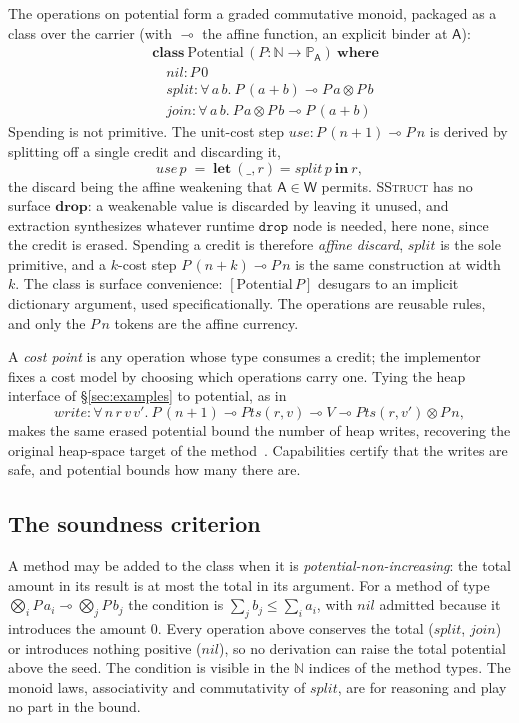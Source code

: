 \documentclass[11pt]{article}
\newcommand{\Wk}{\mathsf{W}}
\newcommand{\Prop}[1]{\mathbb{P}_{#1}}            %
\newcommand{\drp}{\mathtt{drop}}
\theoremstyle{definition}
\theoremstyle{plain}
\begin{document}
The operations on potential form a graded commutative monoid, packaged as a class
over the carrier (with $\multimap$ the affine function, an explicit binder at
$\mathsf{A}$):
\[
\begin{aligned}
&\mathbf{class}\ \mathrm{Potential}\,(P : \mathbb{N}\to\Prop{\mathsf{A}})\ \mathbf{where}\\
&\quad \mathit{nil} : P\,0\\
&\quad \mathit{split} : \forall\,a\,b.\ P\,(a{+}b) \multimap P\,a \otimes P\,b\\
&\quad \mathit{join} : \forall\,a\,b.\ P\,a \otimes P\,b \multimap P\,(a{+}b)
\end{aligned}
\]
Spending is not primitive. The unit-cost step $\mathit{use} : P\,(n{+}1)\multimap
P\,n$ is derived by splitting off a single credit and discarding it,
\[
  \mathit{use}\,p \;=\; \mathbf{let}\ (\_, r) = \mathit{split}\,p\ \mathbf{in}\ r,
\]
the discard being the affine weakening that $\mathsf{A}\in\Wk$ permits.
\textsc{SStruct} has no surface $\mathbf{drop}$: a weakenable value is discarded by
leaving it unused, and extraction synthesizes whatever runtime $\drp$ node is
needed, here none, since the credit is erased. Spending a credit is therefore
\emph{affine discard}, $\mathit{split}$ is the sole primitive, and a $k$-cost step
$P\,(n{+}k)\multimap P\,n$ is the same construction at width $k$. The class is
surface convenience: $[\mathrm{Potential}\,P]$ desugars to an implicit dictionary
argument, used specificationally. The operations are reusable rules, and only the
$P\,n$ tokens are the affine currency.

A \emph{cost point} is any operation whose type consumes a credit; the implementor
fixes a cost model by choosing which operations carry one. Tying the heap
interface of \S\ref{sec:examples} to potential, as in
\[
  \mathit{write} : \forall\,n\,r\,v\,v'.\ P\,(n{+}1) \multimap
  \mathit{Pts}(r,v) \multimap V \multimap \mathit{Pts}(r,v') \otimes P\,n,
\]
makes the same erased potential bound the number of heap writes, recovering the
original heap-space target of the method~\cite{hj}. Capabilities certify that the
writes are safe, and potential bounds how many there are.

\subsection{The soundness criterion}

A method may be added to the class when it is \emph{potential-non-increasing}: the
total amount in its result is at most the total in its argument. For a method of
type $\bigotimes_i P\,a_i \multimap \bigotimes_j P\,b_j$ the condition is
$\textstyle\sum_j b_j \le \sum_i a_i$, with $\mathit{nil}$ admitted because it
introduces the amount $0$. Every operation above conserves the total
($\mathit{split}$, $\mathit{join}$) or introduces nothing positive
($\mathit{nil}$), so no derivation can raise the total potential above the seed.
The condition is visible in the $\mathbb{N}$ indices of the method types. The
monoid laws, associativity and commutativity of $\mathit{split}$, are for reasoning
and play no part in the bound.
\end{document}
